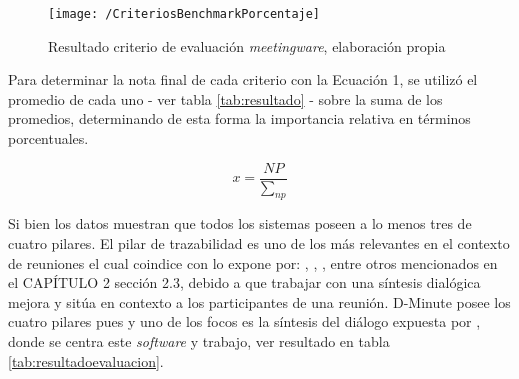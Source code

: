 \begin{figure}[!h]
\centering
\texttt{[image: /CriteriosBenchmarkPorcentaje]}
\caption{Resultado criterio de evaluación \textit{meetingware}, elaboración propia} 
\label{img3-3}
\end{figure}

Para determinar la nota final de cada criterio con la Ecuación 1, se utilizó el promedio de cada uno - ver tabla \ref{tab:resultado} - sobre la suma de los promedios, determinando de esta forma la importancia relativa en términos porcentuales.

\begin{equation}
x = \frac{NP}{\sum_{np}}
\end{equation}

Si bien los datos muestran que todos los sistemas poseen a lo menos tres de cuatro pilares. El pilar de trazabilidad es uno de los más relevantes en el contexto de reuniones el cual coindice con lo expone por: , , ,  entre otros mencionados en el CAPÍTULO 2 sección 2.3, debido a que trabajar con una síntesis dialógica mejora y sitúa en contexto a los participantes de una reunión. D-Minute posee los cuatro pilares pues y uno de los focos es la síntesis del diálogo expuesta por , donde se centra este \textit{software} y trabajo, ver resultado en tabla \ref{tab:resultadoevaluacion}.

